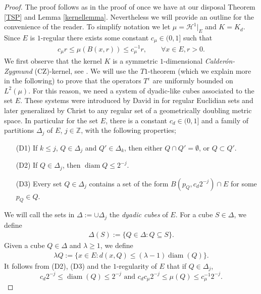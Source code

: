 \documentclass[11pt]{amsart}
\def\diam{{\rm diam\,}}
\theoremstyle{definition}
\newcommand{\ha}{\mathcal{H}}
\newcommand{\ve}{\varepsilon}
\newcommand{\Z}{\mathbb{Z}}
\def\diam{\operatorname{diam}}
\numberwithin{theorem}{section} \numberwithin{equation}{section}
\begin{document}
\begin{proof}
The proof follows as in the proof of \cite[Theorem 1.3]{ChoLi} once we have at our disposal Theorem \ref{TSP} and Lemma \ref{kernellemma}. Nevertheless we will provide an outline for the convenience of the reader. To simplify notation we let $\mu = \ha^1|_E$ and $K=K_d$. Since $E$ is $1$-regular there exists some constant $c_{\mu} \in(0,1]$ such that \begin{align*}
  c_{\mu} r \leq \mu(B(x,r)) \leq c_{\mu}^{-1} r, \qquad \forall x \in E, r > 0.
\end{align*}
We first observe that the kernel $K$ is a symmetric $1$-dimensional {\it Calder\'on-Zygmund} (CZ)-kernel, see \cite[Definition 2.6 and Lemma 2.7]{ChoLi}. 
We will use the $T1$-theorem (which we explain more in the following) to prove that the operators $T^\ve$ are uniformly bounded on $L^2(\mu)$. For this reason, we need a system of dyadic-like cubes associated to the set $E$. These systems were introduced by David in \cite{david-wavelets} for regular Euclidian sets and later generalized by Christ \cite{Chr} to any regular set of a geometrically doubling metric space. In particular for the set $E$, there is a constant $c_{d} \in (0,1]$ and a family of partitions $\Delta_{j}$ of $E$, $j \in \Z$, with the following properties;
\begin{itemize}
\item[(D1)] If $k \leq j$, $Q \in \Delta_{j}$ and $Q' \in
\Delta_{k}$, then either $Q \cap Q' = \emptyset$, or $Q \subset
Q'$. 
\item[(D2)] If $Q \in \Delta_{j}$, then $\diam Q \leq 2^{-j}$.
\item[(D3)] Every set $Q \in \Delta_{j}$ contains a set of the form
$B(p_{Q},c_{d}2^{-j}) \cap E$ for some $p_{Q} \in Q$.
\end{itemize}
We will call the sets in $\Delta := \cup \Delta_{j}$ the \emph{dyadic cubes} of $E$.  %
For a cube $S \in \Delta$, we define
\begin{align*}
  \Delta(S) := \{Q \in \Delta : Q \subseteq S\}.
\end{align*}
Given a cube $Q \in \Delta$ and $\lambda \geq 1$, we define
\begin{align*}
  \lambda Q := \{x \in E : d(x,Q) \leq (\lambda - 1) \diam(Q)\}.
\end{align*}
It follows from (D2), (D3) and the $1$-regularity of $E$ that if $Q \in \Delta_j$,
$$c_d 2^{-j}\leq \diam(Q) \leq 2^{-j} \mbox { and }c_d c_\mu 2^{-j} \leq \mu(Q) \leq c_\mu^{-1} 2^{-j}.$$


\end{proof}
\end{document}
